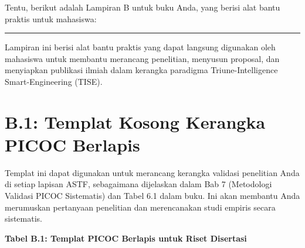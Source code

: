 \documentclass[
  letterpaper,
  DIV=11,
  numbers=noendperiod]{scrreprt}
\begin{document}
Tentu, berikut adalah Lampiran B untuk buku Anda, yang berisi alat bantu
praktis untuk mahasiswa:

\begin{center}\rule{0.5\linewidth}{0.5pt}\end{center}

Lampiran ini berisi alat bantu praktis yang dapat langsung digunakan
oleh mahasiswa untuk membantu merancang penelitian, menyusun proposal,
dan menyiapkan publikasi ilmiah dalam kerangka paradigma
Triune-Intelligence Smart-Engineering (TISE).

\section{\texorpdfstring{\textbf{B.1: Templat Kosong Kerangka PICOC
Berlapis}}{B.1: Templat Kosong Kerangka PICOC Berlapis}}\label{b.1-templat-kosong-kerangka-picoc-berlapis}

Templat ini dapat digunakan untuk merancang kerangka validasi penelitian
Anda di setiap lapisan ASTF, sebagaimana dijelaskan dalam Bab 7
(Metodologi Validasi PICOC Sistematis) dan Tabel 6.1 dalam buku. Ini
akan membantu Anda merumuskan pertanyaan penelitian dan merencanakan
studi empiris secara sistematis.

\textbf{Tabel B.1: Templat PICOC Berlapis untuk Riset Disertasi}
\end{document}
